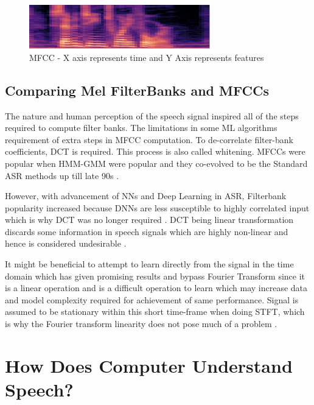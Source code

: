 
\begin{figure}[htb]
    \centering
    \includegraphics[width=0.7\textwidth]{img/mfcc4.jpg}
    \caption{MFCC - X axis represents time and Y Axis represents features}
    \label{fig:mfcc-example}
\end{figure}

\subsection{Comparing Mel FilterBanks and MFCCs}

The nature and human perception of the speech signal inspired all of the steps required to compute filter banks. The limitations in some ML algorithms  requirement of extra steps in MFCC computation. To de-correlate filter-bank coefficients, DCT is required. This process is also called whitening. MFCCs were popular when HMM-GMM were popular and they co-evolved to be the Standard ASR methods up till late 90s \cite{backstrom_introduction_2022}. 

However, with advancement of NNs and Deep Learning in ASR, Filterbank popularity increased because DNNs are less susceptible to highly correlated input which is why DCT was no longer required \cite{raj_note_nodate}. DCT  being linear transformation discards some information in speech signals which are highly non-linear and hence is considered undesirable \cite{fayek_speech_2016}.

It might be beneficial to attempt to learn directly from the signal in the time domain which has given promising results and bypass Fourier Transform since it is a linear operation and is a difficult operation to learn which may increase data and model complexity required for achievement of same performance. Signal is assumed to be stationary within this short time-frame when doing STFT, which is why the Fourier transform linearity does not pose much of a problem \cite{fayek_speech_2016}.

\section{How Does Computer Understand Speech?}
\label{sec:what-is-asr}

